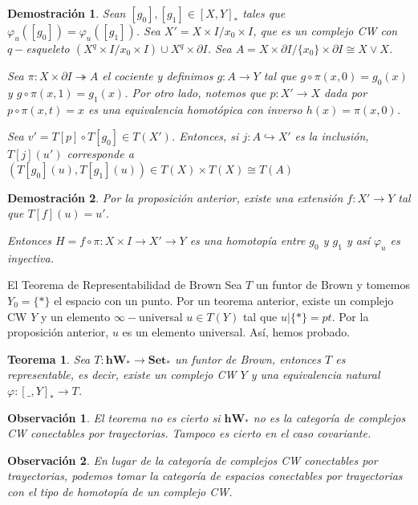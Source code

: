 \documentclass{beamer}
\newtheorem{teo}{Teorema}
\newtheorem{obs}{Observaci\'on}
\newtheorem{dem}{Demostraci\'on}
\newcommand{\con}{\mathbf{Set}}
\newcommand{\W}{\mathbf{hW}}
\begin{document}
\begin{frame}
	\begin{dem}
		Sean $[g_0],[g_1]\in[X,Y]_\ast$ tales que $\varphi_u ([g_0])=\varphi_u([g_1])$. Sea $X'=X\times I/{x_0}\times I$, que es un complejo CW con $q-$esqueleto $(X^q\times I/{x_0}\times I)\cup X^q\times\partial I$. Sea $A=X\times \partial I/\{x_0\}\times \partial I\cong X\vee X$. 
		
		Sea $\pi\colon X\times\partial I\twoheadrightarrow A$ el cociente y definimos $g\colon A\to Y$ tal que $g\circ\pi(x,0)=g_0(x)$ y $g\circ\pi(x,1)=g_1(x)$. Por otro lado, notemos que $p\colon X'\to X$ dada por $p\circ\pi(x,t)=x$ es una equivalencia homotópica con inverso $h(x)=\pi(x,0)$.
		
		Sea $v'=T[p]\circ T[g_0]\in T(X')$. Entonces, si $j\colon A \hookrightarrow X'$ es la inclusión, $T[j](u')$ corresponde a $(T[g_0](u),T[g_1](u))\in T(X)\times T(X)\cong T(A)$
	\end{dem}
\end{frame}

\begin{frame}
	\begin{dem}
		Por la proposición anterior, existe una extensión $f\colon X'\to Y$ tal que $T[f](u)=u'$. 
		
		Entonces $H=f\circ\pi\colon X\times I\to X'\to Y$ es una homotopía entre $g_0$ y $g_1$ y así $\varphi_u$ es inyectiva.
	\end{dem}
\end{frame}

\begin{frame}{El Teorema de Representabilidad de Brown}
	Sea $T$ un funtor de Brown y tomemos $Y_0=\{\ast\}$ el espacio con un punto. Por un teorema anterior, existe un complejo CW $Y$ y un elemento $\infty-$universal $u\in T(Y)$ tal que $u|\{\ast\}=pt$. Por la proposición anterior, $u$ es un elemento universal. Así, hemos probado.
	
	\begin{teo}
		Sea $T\colon \W_\ast \to \con_\ast$ un funtor de Brown, entonces $T$ es representable, es decir, existe un complejo CW $Y$ y una equivalencia natural $\varphi\colon [\_,Y]_\ast \to T$.
	\end{teo}
\end{frame}

\begin{frame}
	\begin{obs}
		El teorema no es cierto si $\W_\ast$ no es la categoría de complejos CW conectables por trayectorias. Tampoco es cierto en el caso covariante.
	\end{obs}
	
	\begin{obs}
		En lugar de la categoría de complejos CW conectables por trayectorias, podemos tomar la categoría de espacios conectables por trayectorias con el tipo de homotopía de un complejo CW.
	\end{obs}
\end{frame}
\end{document}
